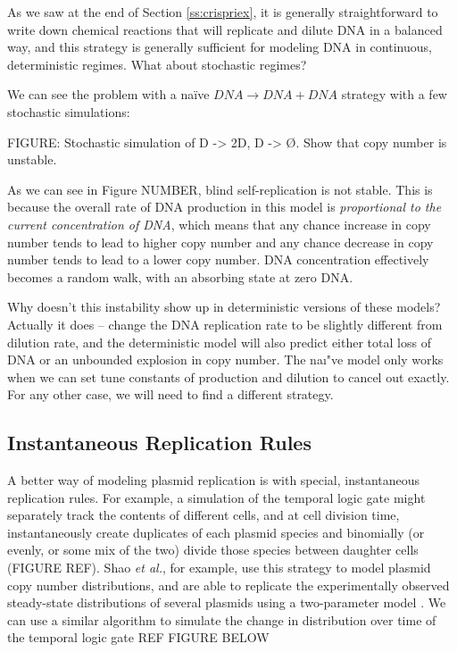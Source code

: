 \documentclass[preprint,12pt]{elsarticle}
\begin{document}
As we saw at the end of Section \ref{ss:crispriex}, it is generally straightforward to write down chemical reactions that will replicate and dilute DNA in a balanced way, and this strategy is generally sufficient for modeling DNA in continuous, deterministic regimes. What about stochastic regimes? 

We can see the problem with a na\"ive $DNA \rightarrow DNA + DNA$ strategy with a few stochastic simulations:

\vspace{.5in}
FIGURE: Stochastic simulation of D -> 2D, D -> Ø. Show that copy number is unstable. 
\vspace{.5in}

As we can see in Figure {NUMBER}, blind self-replication is not stable. This is because the overall rate of DNA production in this model is \emph{proportional to the current concentration of DNA}, which means that any chance increase in copy number tends to lead to higher copy number and any chance decrease in copy number tends to lead to a lower copy number. DNA concentration effectively becomes a random walk, with an absorbing state at zero DNA. 

Why doesn't this instability show up in deterministic versions of these models? Actually it does -- change the DNA replication rate to be slightly different from dilution rate, and the deterministic model will also predict either total loss of DNA or an unbounded explosion in copy number. The na\i"ve model only works when we can set tune constants of production and dilution to cancel out exactly. For any other case, we will need to find a different strategy.

\subsection{Instantaneous Replication Rules}

A better way of modeling plasmid replication is with special, instantaneous replication rules. For example, a simulation of the temporal logic gate might separately track the contents of different cells, and at cell division time, instantaneously create duplicates of each plasmid species and binomially (or evenly, or some mix of the two) divide those species between daughter cells (FIGURE REF). Shao \emph{et al.}, for example, use this strategy to model plasmid copy number distributions, and are able to replicate the experimentally observed steady-state distributions of several plasmids using a two-parameter model \cite{Shao2021}. We can use a similar algorithm to simulate the change in distribution over time of the temporal logic gate {REF FIGURE BELOW}
\end{document}
